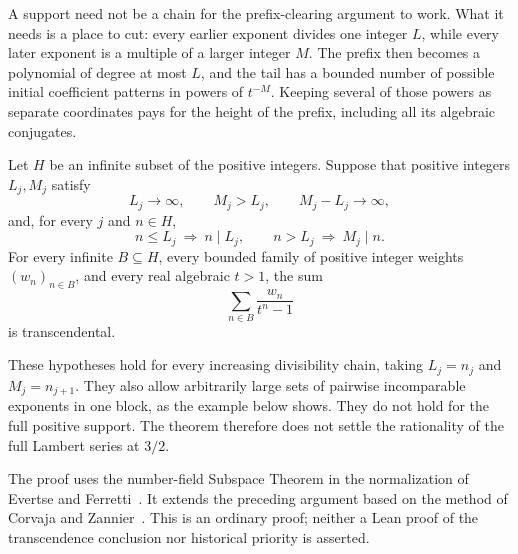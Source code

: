 \documentclass[11pt]{article}
\begin{document}
A support need not be a chain for the prefix-clearing argument to work.
What it needs is a place to cut: every earlier exponent divides one integer
$L$, while every later exponent is a multiple of a larger integer $M$.
The prefix then becomes a polynomial of degree at most $L$, and the tail
has a bounded number of possible initial coefficient patterns in powers of
$t^{-M}$. Keeping several of those powers as separate coordinates pays for
the height of the prefix, including all its algebraic conjugates.

\begin{theorem}
\label{thm:separated-cuts}
Let $H$ be an infinite subset of the positive integers. Suppose that positive
integers $L_j,M_j$ satisfy
\[
 L_j\longrightarrow\infty,\qquad M_j>L_j,\qquad M_j-L_j\longrightarrow\infty,
\]
and, for every $j$ and $n\in H$,
\[
 n\le L_j\ \Longrightarrow\ n\mid L_j,
 \qquad n>L_j\ \Longrightarrow\ M_j\mid n.
\]
For every infinite $B\subseteq H$, every bounded family of positive integer
weights $(w_n)_{n\in B}$, and every real algebraic $t>1$, the sum
\[
 \sum_{n\in B}\frac{w_n}{t^n-1}
\]
is transcendental.
\end{theorem}

These hypotheses hold for every increasing divisibility chain, taking
$L_j=n_j$ and $M_j=n_{j+1}$. They also allow arbitrarily large sets of
pairwise incomparable exponents in one block, as the example below shows.
They do not hold for the full positive support. The theorem therefore does
not settle the rationality of the full Lambert series at $3/2$.

The proof uses the number-field Subspace Theorem in the normalization of
Evertse and Ferretti~\cite[\S1.1, (1.1); \S2.1]{evertseferretti2013}.
It extends the preceding argument based on the method of Corvaja and
Zannier~\cite[Theorem~4]{corvajazannier2002}. This is an ordinary proof;
neither a Lean proof of the transcendence conclusion nor historical
priority is asserted.
\end{document}
